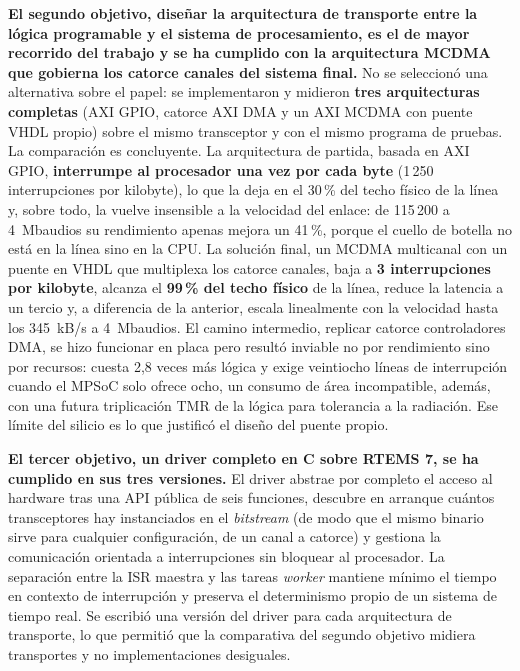 \textbf{El segundo objetivo, diseñar la arquitectura de transporte entre la lógica programable y
el sistema de procesamiento, es el de mayor recorrido del trabajo y se ha cumplido con la
arquitectura MCDMA que gobierna los catorce canales del sistema final.} No se seleccionó una
alternativa sobre el papel: se implementaron y midieron
\textbf{tres arquitecturas completas} (AXI GPIO, catorce AXI DMA y un AXI MCDMA con puente VHDL
propio) sobre el mismo transceptor y con el mismo programa de pruebas. La comparación es
concluyente. La arquitectura de partida, basada en AXI GPIO, \textbf{interrumpe al procesador una
vez por cada byte} (1\,250 interrupciones por kilobyte), lo que la deja en el 30\,\% del techo físico
de la línea y, sobre todo, la vuelve insensible a la velocidad del enlace: de 115\,200 a
4~Mbaudios su rendimiento apenas mejora un 41\,\%, porque el cuello de botella no está en la línea
sino en la CPU. La solución final, un MCDMA multicanal con un puente en VHDL que multiplexa los
catorce canales, baja a \textbf{3 interrupciones por kilobyte}, alcanza el \textbf{99\,\% del techo
físico} de la línea, reduce la latencia a un tercio y, a diferencia de la anterior, escala
linealmente con la velocidad hasta los 345~kB/s a 4~Mbaudios. El camino intermedio, replicar
catorce controladores DMA, se hizo funcionar en placa pero resultó inviable no por rendimiento sino
por recursos: cuesta 2,8 veces más lógica y exige veintiocho líneas de interrupción cuando el MPSoC
solo ofrece ocho, un consumo de área incompatible, además, con una futura triplicación TMR de la
lógica para tolerancia a la radiación. Ese límite del silicio es lo que justificó el diseño del
puente propio.

\textbf{El tercer objetivo, un driver completo en C sobre RTEMS 7, se ha cumplido en sus tres
versiones.} El driver abstrae por completo el acceso al hardware tras una API pública de seis
funciones, descubre en arranque cuántos transceptores hay instanciados en el \textit{bitstream}
(de modo que el mismo binario sirve para cualquier configuración, de un canal a catorce) y gestiona
la comunicación orientada a interrupciones sin bloquear al procesador. La separación entre la ISR
maestra y las tareas \textit{worker} mantiene mínimo el tiempo en contexto de interrupción y
preserva el determinismo propio de un sistema de tiempo real. Se escribió una versión del driver
para cada arquitectura de transporte, lo que permitió que la comparativa del segundo objetivo
midiera transportes y no implementaciones desiguales.

